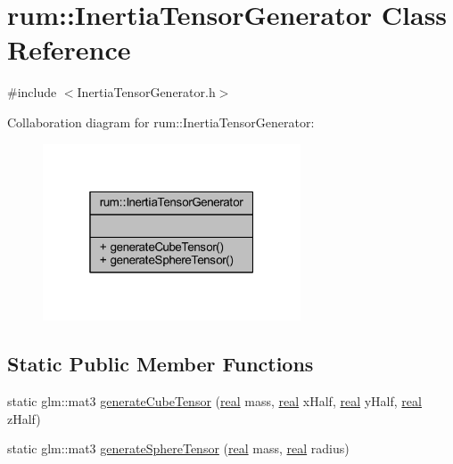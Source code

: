\hypertarget{classrum_1_1_inertia_tensor_generator}{}\section{rum\+:\+:Inertia\+Tensor\+Generator Class Reference}
\label{classrum_1_1_inertia_tensor_generator}


{\ttfamily \#include $<$Inertia\+Tensor\+Generator.\+h$>$}



Collaboration diagram for rum\+:\+:Inertia\+Tensor\+Generator\+:\nopagebreak
\begin{figure}[H]
\begin{center}
\leavevmode
\includegraphics[width=217pt]{classrum_1_1_inertia_tensor_generator__coll__graph}
\end{center}
\end{figure}
\subsection*{Static Public Member Functions}
\begin{DoxyCompactItemize}
\item 
static glm\+::mat3 \mbox{\hyperlink{classrum_1_1_inertia_tensor_generator_a95d0bac5bb1f99a9521430d3bcb7ed04}{generate\+Cube\+Tensor}} (\mbox{\hyperlink{namespacerum_a7e8cca23573d5eaead0f138cbaa4862c}{real}} mass, \mbox{\hyperlink{namespacerum_a7e8cca23573d5eaead0f138cbaa4862c}{real}} x\+Half, \mbox{\hyperlink{namespacerum_a7e8cca23573d5eaead0f138cbaa4862c}{real}} y\+Half, \mbox{\hyperlink{namespacerum_a7e8cca23573d5eaead0f138cbaa4862c}{real}} z\+Half)
\item 
static glm\+::mat3 \mbox{\hyperlink{classrum_1_1_inertia_tensor_generator_a09e5c5415aed546cc95e2b4527ec19d7}{generate\+Sphere\+Tensor}} (\mbox{\hyperlink{namespacerum_a7e8cca23573d5eaead0f138cbaa4862c}{real}} mass, \mbox{\hyperlink{namespacerum_a7e8cca23573d5eaead0f138cbaa4862c}{real}} radius)
\end{DoxyCompactItemize}


